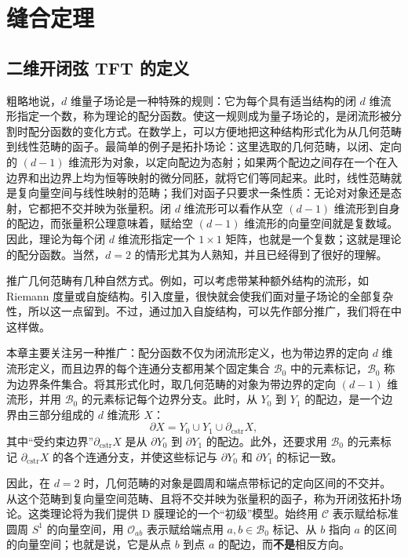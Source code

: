 \section{缝合定理}\label{sec:2.1}
\subsection{二维开闭弦 TFT 的定义}\label{sec:2.1.1}

粗略地说，$d$ 维量子场论是一种特殊的规则：它为每个具有适当结构的闭 $d$ 维流形指定一个数，称为理论的配分函数。使这一规则成为量子场论的，是闭流形被分割时配分函数的变化方式。在数学上，可以方便地把这种结构形式化为从几何范畴到线性范畴的函子。最简单的例子是拓扑场论：这里选取的几何范畴，以闭、定向的 $(d-1)$ 维流形为对象，以定向配边为态射；如果两个配边之间存在一个在入边界和出边界上均为恒等映射的微分同胚，就将它们等同起来。此时，线性范畴就是复向量空间与线性映射的范畴；我们对函子只要求一条性质：无论对对象还是态射，它都把不交并映为张量积。闭 $d$ 维流形可以看作从空 $(d-1)$ 维流形到自身的配边，而张量积公理意味着，赋给空 $(d-1)$ 维流形的向量空间就是复数域。因此，理论为每个闭 $d$ 维流形指定一个 $1\times1$ 矩阵，也就是一个复数；这就是理论的配分函数。当然，$d=2$ 的情形尤其为人熟知，并且已经得到了很好的理解。

推广几何范畴有几种自然方式。例如，可以考虑带某种额外结构的流形，如 Riemann 度量或自旋结构。引入度量，很快就会使我们面对量子场论的全部复杂性，所以这一点留到。不过，通过加入自旋结构，可以先作部分推广，我们将在中这样做。

本章主要关注另一种推广：配分函数不仅为闭流形定义，也为带边界的定向 $d$ 维流形定义，而且边界的每个连通分支都用某个固定集合 $\mathcal{B}_0$ 中的元素标记，$\mathcal{B}_0$ 称为边界条件集合。将其形式化时，取几何范畴的对象为带边界的定向 $(d-1)$ 维流形，并用 $\mathcal{B}_0$ 的元素标记每个边界分支。此时，从 $Y_0$ 到 $Y_1$ 的配边，是一个边界由三部分组成的 $d$ 维流形 $X$：
\[
\partial X=Y_0\cup Y_1\cup\partial_{\mathrm{cstr}}X,
\]
其中“受约束边界”$\partial_{\mathrm{cstr}}X$ 是从 $\partial Y_0$ 到 $\partial Y_1$ 的配边。此外，还要求用 $\mathcal{B}_0$ 的元素标记 $\partial_{\mathrm{cstr}}X$ 的各个连通分支，并使这些标记与 $\partial Y_0$ 和 $\partial Y_1$ 的标记一致。

因此，在 $d=2$ 时，几何范畴的对象是圆周和端点带标记的定向区间的不交并。从这个范畴到复向量空间范畴、且将不交并映为张量积的函子，称为开闭弦拓扑场论。这类理论将为我们提供 D 膜理论的一个“初级”模型。始终用 $\mathcal{C}$ 表示赋给标准圆周 $S^1$ 的向量空间，用 $\mathcal{O}_{ab}$ 表示赋给端点用 $a,b\in\mathcal{B}_0$ 标记、从 $b$ 指向 $a$ 的区间的向量空间；也就是说，它是从点 $b$ 到点 $a$ 的配边，而\textbf{不是}相反方向。

